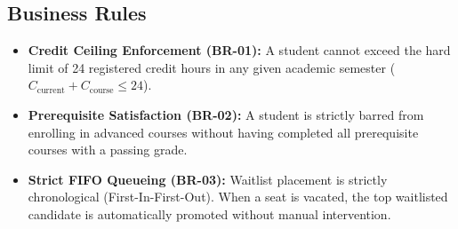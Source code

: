 \documentclass[a4paper,12pt]{article}
\begin{document}
\subsection{Business Rules}
\begin{itemize}[leftmargin=1.2cm]
    \item \textbf{Credit Ceiling Enforcement (BR-01):} A student cannot exceed the hard limit of 24 registered credit hours in any given academic semester ($C_{\text{current}} + C_{\text{course}} \le 24$).
    \item \textbf{Prerequisite Satisfaction (BR-02):} A student is strictly barred from enrolling in advanced courses without having completed all prerequisite courses with a passing grade.
    \item \textbf{Strict FIFO Queueing (BR-03):} Waitlist placement is strictly chronological (First-In-First-Out). When a seat is vacated, the top waitlisted candidate is automatically promoted without manual intervention.
\end{itemize}
\end{document}
